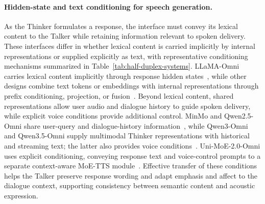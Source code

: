 \paragraph{Hidden-state and text conditioning for speech generation.}
As the Thinker formulates a response, the interface must convey its lexical content to the Talker while retaining information relevant to spoken delivery. These interfaces differ in whether lexical content is carried
implicitly by internal representations or supplied explicitly as text,
with representative conditioning mechanisms summarized in
Table~\ref{tab:half-duplex-systems}.
LLaMA-Omni carries lexical content implicitly through response
hidden states~\citep{DBLP:conf/iclr/FangGZMZ025}, while other designs combine
text tokens or embeddings with internal representations through
prefix conditioning, projection, or fusion~\citep{DBLP:conf/icml/WangLFZS000M25,DBLP:journals/corr/abs-2501-06282,DBLP:journals/corr/abs-2503-20215,DBLP:journals/corr/abs-2505-02625}.
Beyond lexical content, shared representations allow user audio and
dialogue history to guide spoken delivery, while explicit voice
conditions provide additional control.
MinMo and Qwen2.5-Omni share user-query and dialogue-history
information~\citep{DBLP:journals/corr/abs-2501-06282,DBLP:journals/corr/abs-2503-20215}, while Qwen3-Omni
and Qwen3.5-Omni supply multimodal Thinker representations with
historical and streaming text; the latter also provides voice
conditions~\citep{DBLP:journals/corr/abs-2509-17765,DBLP:journals/corr/abs-2604-15804}.
Uni-MoE-2.0-Omni uses explicit conditioning, conveying response text and voice-control
prompts to a separate context-aware MoE-TTS
module~\citep{DBLP:journals/corr/abs-2511-12609}.
Effective transfer of these conditions helps the Talker
preserve response wording and adapt emphasis and affect to the
dialogue context, supporting consistency between semantic content
and acoustic expression.

% 

